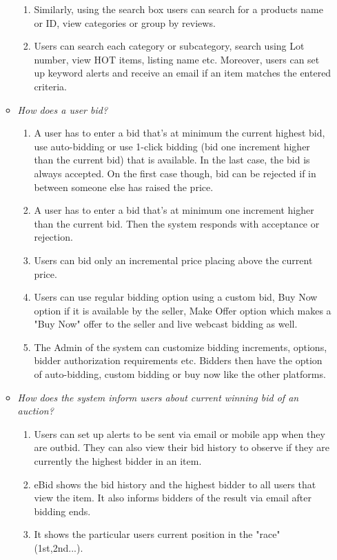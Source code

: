 \documentclass[letterpaper,twocolumn,10pt]{article}
\begin{document}
\begin{itemize}
\begin{itemize}
\begin{enumerate}
    \item Similarly, using the search box users can search for a products name or ID, view categories or group by reviews.
    \item Users can search each category or subcategory, search using Lot number, view HOT items, listing name etc. Moreover, users can set up keyword alerts and receive an email if an item matches the entered criteria.
    \end{enumerate}  
\item \emph{How does a user bid?}
    \begin{enumerate}
    \item A user has to enter a bid that's at minimum the current highest bid, use auto-bidding or use 1-click bidding (bid one increment higher than the current bid) that is available. In the last case, the bid is always accepted. On the first case though, bid can be rejected if in between someone else has raised the price.
    \item A user has to enter a bid that's at minimum  one increment higher than the current bid. Then the system responds with acceptance or rejection.
    \item Users can bid only an incremental price placing above the current price.
    \item Users can use regular bidding option using a custom bid, Buy Now option if it is available by the seller, Make Offer option which makes a "Buy Now" offer to the seller and live webcast bidding as well.
    \item The Admin of the system can customize bidding increments, options, bidder authorization requirements etc. Bidders then have the option of auto-bidding, custom bidding or buy now like the other platforms.
    \end{enumerate} 
\item \emph{How does the system inform users about current winning bid of an auction?}
    \begin{enumerate}
    \item Users can set up alerts to be sent via email or mobile app when they are outbid. They can also view their bid history to observe if they are currently the highest bidder in an item.
    \item eBid shows the bid history and the highest bidder to all users that view the item. It also informs bidders of the result via email after bidding ends.
    \item It shows the particular users current position in the "race" (1st,2nd...).

\end{enumerate}
\end{itemize}
\end{itemize}
\end{document}
